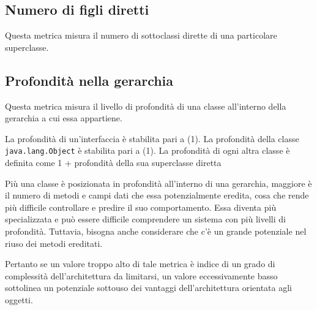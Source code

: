 \subsection{Numero di figli diretti}
Questa metrica misura il numero di sottoclassi dirette di una particolare superclasse.



\subsection{Profondità nella gerarchia}
Questa metrica misura il livello di profondità di una classe all'interno della gerarchia a cui essa appartiene. 

La profondità di un'interfaccia è stabilita pari a (1). La profondità della classe \texttt{java.lang.Object} è stabilita pari a (1). La profondità di ogni altra classe è definita come 1 + profondità della sua superclasse diretta

Più una classe è posizionata in profondità all'interno di una gerarchia, maggiore è il numero di metodi e campi dati che essa potenzialmente eredita, cosa che rende più difficile controllare e predire il suo comportamento. Essa diventa più specializzata e può essere difficile comprendere un sistema con più livelli di profondità. Tuttavia, bisogna anche considerare che c'è un grande potenziale nel riuso dei metodi ereditati.

Pertanto se un valore troppo alto di tale metrica è indice di un grado di complessità dell'architettura da limitarsi, un valore eccessivamente basso sottolinea un potenziale sottouso dei vantaggi dell'architettura orientata agli oggetti.


